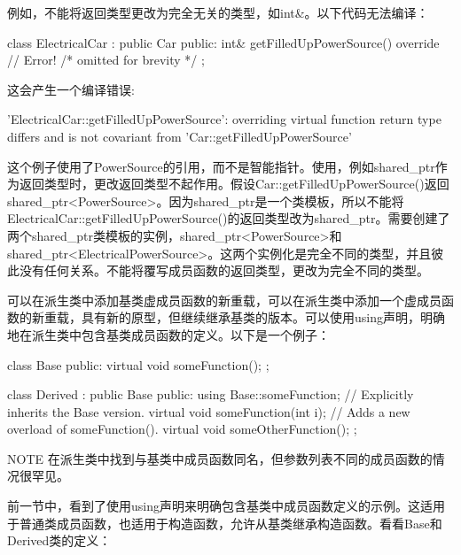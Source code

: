 例如，不能将返回类型更改为完全无关的类型，如int\&。以下代码无法编译：

\begin{cpp}
class ElectricalCar : public Car
{
    public:
        int& getFilledUpPowerSource() override // Error!
        { /* omitted for brevity */ }
};
\end{cpp}

这会产生一个编译错误:

\begin{shell}
'ElectricalCar::getFilledUpPowerSource': overriding virtual function return type
differs and is not covariant from 'Car::getFilledUpPowerSource'
\end{shell}

这个例子使用了PowerSource的引用，而不是智能指针。使用，例如shared\_ptr作为返回类型时，更改返回类型不起作用。假设Car::getFilledUpPowerSource()返回shared\_ptr<PowerSource>。因为shared\_ptr是一个类模板，所以不能将ElectricalCar::getFilledUpPowerSource()的返回类型改为shared\_ptr。需要创建了两个shared\_ptr类模板的实例，shared\_ptr<PowerSource>和shared\_ptr<ElectricalPowerSource>。这两个实例化是完全不同的类型，并且彼此没有任何关系。不能将覆写成员函数的返回类型，更改为完全不同的类型。


可以在派生类中添加基类虚成员函数的新重载，可以在派生类中添加一个虚成员函数的新重载，具有新的原型，但继续继承基类的版本。可以使用using声明，明确地在派生类中包含基类成员函数的定义。以下是一个例子：

\begin{cpp}
class Base
{
    public:
        virtual void someFunction();
};

class Derived : public Base
{
    public:
        using Base::someFunction; // Explicitly inherits the Base version.
        virtual void someFunction(int i); // Adds a new overload of someFunction().
        virtual void someOtherFunction();
};
\end{cpp}

\begin{myNotic}{NOTE}
在派生类中找到与基类中成员函数同名，但参数列表不同的成员函数的情况很罕见。
\end{myNotic}


前一节中，看到了使用using声明来明确包含基类中成员函数定义的示例。这适用于普通类成员函数，也适用于构造函数，允许从基类继承构造函数。看看Base和Derived类的定义：

